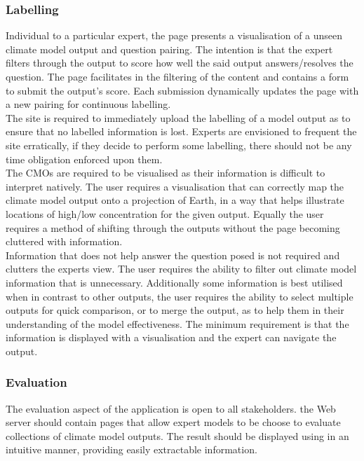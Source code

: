 \documentclass{ecmm427_assignment}
\begin{document}
\subsubsection{Labelling}

Individual to a particular expert, the page presents a visualisation of a unseen climate model output and question pairing. The intention is that the expert filters through the output to score how well the said output answers/resolves the question. The page facilitates in the filtering of the content and contains a form to submit the output's score. Each submission dynamically updates the page with a new pairing for continuous labelling.\\

\noindent The site is required to immediately upload the labelling of a model output as to ensure that no labelled information is lost. Experts are envisioned to frequent the site erratically, if they decide to perform some labelling, there should not be any time obligation enforced upon them.\\

\noindent The CMOs are required to be visualised as their information is difficult to interpret natively. The user requires a visualisation that can correctly map the climate model output onto a projection of Earth, in a way that helps illustrate locations of high/low concentration for the given output. Equally the user requires a method of shifting through the outputs without the page becoming cluttered with information.\\

\noindent Information that does not help answer the question posed is not required and clutters the experts view. The user requires the ability to filter out climate model information that is unnecessary. Additionally some information is best utilised when in contrast to other outputs, the user requires the ability to select multiple outputs for quick comparison, or to merge the output, as to help them in their understanding of the model effectiveness. The minimum requirement is that the information is displayed with a visualisation and the expert can navigate the output. 

\subsubsection{Evaluation}

The evaluation aspect of the application is open to all stakeholders. the Web server should contain pages that allow expert models to be choose to evaluate collections of climate model outputs. The result should be displayed using in an intuitive manner, providing easily extractable information.\\
\end{document}
